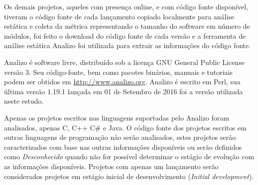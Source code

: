 Os demais projetos, aqueles com presença online, e com código fonte disponível,
tiveram o código fonte de cada lançamento copiado localmente para análise
estática e coleta da métrica representando o tamanho do software em número de
módulos, foi feito o download do código fonte de cada versão e a ferramenta de
análise estática Analizo foi utilizada para extrair as informações do código
fonte.

Analizo é software livre, distribuído sob a licença GNU General Public License
versão 3. Seu código-fonte, bem como pacotes binários, manuais e tutoriais
podem ser obtidos em \url{http://www.analizo.org}. Analizo é escrito em Perl,
sua última versão 1.19.1 lançada em 01 de Setembro de 2016 foi a versão
utilizada neste estudo.

Apenas os projetos escritos nas linguagens suportadas pelo Analizo foram
analisados, apenas C, C++ C\# e Java. O código fonte dos projetos escritos em
outras linguagens de programação não serão analisados, estes projetos serão caracterizados
com base nas outras informações disponíveis ou serão definidos como {\it Desconhecido} quando não for possível determinar o estágio de evolução com as informações disponíveis. Projetos com apenas um
lançamento serão considerados projetos em estágio inicial de desenvolvimento
({\it Initial development}).







